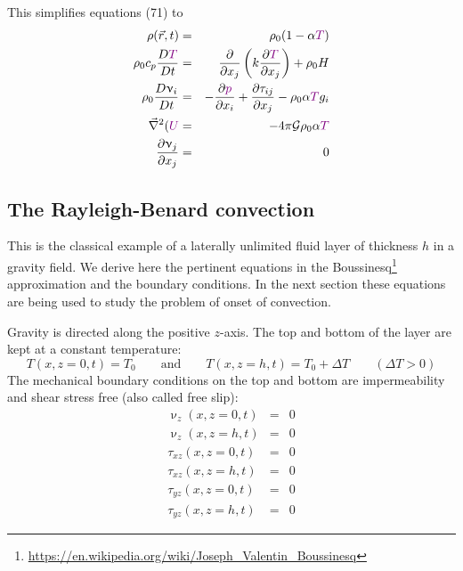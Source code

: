 This simplifies equations (71) to
\begin{eqnarray}
\rho(\vec{r},t) &=& \rho_0 (1-\alpha {\color{violet}T}) \\
\rho_0 c_p \frac{D {\color{violet}T} }{Dt} &=& \frac{\partial}{\partial x_j}
\left( k \frac{\partial {\color{violet}T}}{\partial x_j}  \right) + \rho_0 H \\
\rho_0 \frac{D\upnu_i}{Dt} &=& -\frac{\partial {\color{violet} p}}{\partial x_i}
+\frac{\partial \tau_{ij}}{\partial x_j} - \rho_0 \alpha {\color{violet}T} g_i \\
\vec\nabla^2( {\color{violet}U} &=& -4 \pi {\cal G} \rho_0 \alpha {\color{violet}T} \\
\frac{\partial \upnu_j}{\partial x_j} &=& 0
\end{eqnarray}

\subsection{The Rayleigh-Benard convection}

This is the classical example of a laterally unlimited fluid layer of thickness $h$ in a gravity
field. We derive here the pertinent equations in the Boussinesq\footnote{
\url{https://en.wikipedia.org/wiki/Joseph_Valentin_Boussinesq}} approximation and the
boundary conditions. In the next section these equations are being used to study the
problem of onset of convection.

Gravity is directed along the positive $z$-axis. The top and bottom of the layer are kept at a
constant temperature:
\begin{equation}
T(x,z=0,t)=T_0 
\qquad
\text{and}
\qquad
T(x,z=h,t)=T_0 + \Delta T \qquad (\Delta T>0)
\end{equation}
The mechanical boundary conditions on the top and bottom are impermeability and shear
stress free (also called free slip):
\begin{eqnarray}
\upnu_z(x,z=0,t) &=& 0 \\
\upnu_z(x,z=h,t) &=& 0 \\
\tau_{xz}(x,z=0,t) &=& 0 \\
\tau_{xz}(x,z=h,t) &=& 0 \\
\tau_{yz}(x,z=0,t) &=& 0 \\
\tau_{yz}(x,z=h,t) &=& 0 
\end{eqnarray}

\vspace{0.5cm}
\vspace{0.5cm}

